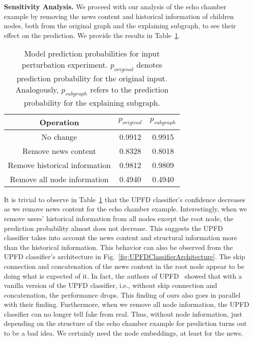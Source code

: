 \textbf{Sensitivity Analysis.} We proceed with our analysis of the echo chamber example by removing the news content and historical information of children nodes, both from the original graph and the explaining subgraph, to see their effect on the prediction. We provide the results in Table~\ref{tab:echoChamberFeatureRemovalExperimentResults}.\\
\begin{table}
    \centering
    \begin{tabular}{c | c | c}
        \textbf{Operation}            & $p_{original}$ & $p_{subgraph}$ \\
        \hline
        No change                     & 0.9912         & 0.9915         \\
        \hline
        Remove news content           & 0.8328         & 0.8018         \\
        \hline
        Remove historical information & 0.9812         & 0.9809         \\
        \hline
        Remove all node information   & 0.4940         & 0.4940         \\
    \end{tabular}
    \caption[Model prediction probabilities for input perturbation experiment.]{Model prediction probabilities for input perturbation experiment. $p_{original}$ denotes prediction probability for the original input. Analogously, $p_{subgraph}$ refers to the prediction probability for the explaining subgraph.}
    \label{tab:echoChamberFeatureRemovalExperimentResults}
\end{table}
It is trivial to observe in Table~\ref{tab:echoChamberFeatureRemovalExperimentResults} that the UPFD classifier's confidence decreases as we remove news content for the echo chamber example. Interestingly, when we remove users' historical information from all nodes except the root node, the prediction probability almost does not decrease. This suggests the UPFD classifier takes into account the news content and structural information more than the historical information. This behavior can also be observed from the UPFD classifier's architecture in Fig.~\ref{fig:UPFDClassifierArchitecture}. The skip connection and concatenation of the news content in the root node appear to be doing what is expected of it. In fact, the authors of UPFD~\parencite{UPFD_Dataset_Shu} showed that with a vanilla version of the UPFD classifier, i.e., without skip connection and concatenation, the performance drops. This finding of ours also goes in parallel with their finding. Furthermore, when we remove all node information, the UPFD classifier can no longer tell fake from real. Thus, without node information, just depending on the structure of the echo chamber example for prediction turns out to be a bad idea. We certainly need the node embeddings, at least for the news.\\

